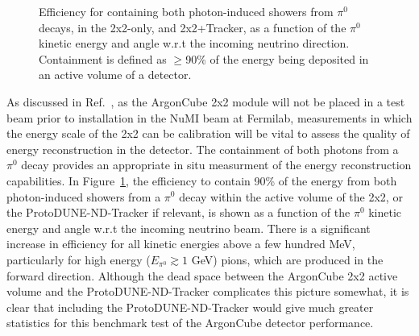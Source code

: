 \begin{figure}[htb]
  \centering
  \caption{Efficiency for containing both photon-induced showers from $\pi^{0}$ decays, in the 2x2-only, and 2x2+Tracker, as a function of the $\pi^{0}$ kinetic energy and angle w.r.t the incoming neutrino direction. Containment is defined as $\geq$90\% of the energy being deposited in an active volume of a detector.}
  \label{fig:pi0_containment}
\end{figure}
As discussed in Ref.~\cite{2x2@FNAL}, as the ArgonCube 2x2 module will not be placed in a test beam prior to installation in the NuMI beam at Fermilab, measurements in which the energy scale of the 2x2 can be calibration will be vital to assess the quality of energy reconstruction in the detector. The containment of both photons from a $\pi^{0}$ decay provides an appropriate in situ measurment of the energy reconstruction capabilities. In Figure~\ref{fig:pi0_containment}, the efficiency to contain 90\% of the energy from both photon-induced showers from a $\pi^{0}$ decay within the active volume of the 2x2, or the ProtoDUNE-ND-Tracker if relevant, is shown as a function of the $\pi^{0}$ kinetic energy and angle w.r.t the incoming neutrino beam. There is a significant increase in efficiency for all kinetic energies above a few hundred MeV, particularly for high energy ($E_{\pi^{0}} \gtrsim 1$ GeV) pions, which are produced in the forward direction. Although the dead space between the ArgonCube 2x2 active volume and the ProtoDUNE-ND-Tracker complicates this picture somewhat, it is clear that including the ProtoDUNE-ND-Tracker would give much greater statistics for this benchmark test of the ArgonCube detector performance.


